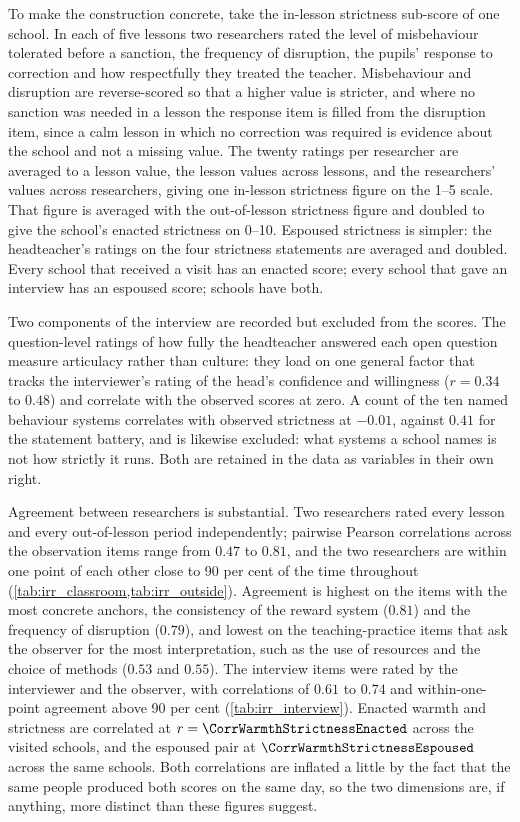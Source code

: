 To make the construction concrete, take the in-lesson strictness sub-score
of one school. In each of five lessons two researchers rated the level of
misbehaviour tolerated before a sanction, the frequency of disruption, the
pupils' response to correction and how respectfully they treated the teacher.
Misbehaviour and disruption are reverse-scored so that a higher value is
stricter, and where no sanction was needed in a lesson the response item is
filled from the disruption item, since a calm lesson in which no correction
was required is evidence about the school and not a missing value. The
twenty ratings per researcher are averaged to a lesson value, the lesson
values across lessons, and the researchers' values across researchers, giving
one in-lesson strictness figure on the 1--5 scale. That figure is averaged
with the out-of-lesson strictness figure and doubled to give the school's
enacted strictness on 0--10. Espoused strictness is simpler: the
headteacher's ratings on the four strictness statements are averaged and
doubled. Every school that received a visit has an enacted score; every
school that gave an interview has an espoused score; \NTierOne{} schools
have both.

Two components of the interview are recorded but excluded from the scores. The
question-level ratings of how fully the headteacher answered each open
question measure articulacy rather than culture: they load on one general
factor that tracks the interviewer's rating of the head's confidence and
willingness ($r = 0.34$ to $0.48$) and correlate with the observed scores at
zero. A count of the ten named behaviour systems correlates with observed
strictness at $-0.01$, against $0.41$ for the statement battery, and is
likewise excluded: what systems a school names is not how strictly it runs.
Both are retained in the data as variables in their own right.

Agreement between researchers is substantial. Two researchers rated every
lesson and every out-of-lesson period independently; pairwise Pearson
correlations across the observation items range from $0.47$ to $0.81$, and
the two researchers are within one point of each other close to 90 per cent
of the time throughout (\cref{tab:irr_classroom,tab:irr_outside}). Agreement
is highest on the items with the most concrete anchors, the consistency of
the reward system ($0.81$) and the frequency of disruption ($0.79$), and
lowest on the teaching-practice items that ask the observer for the most
interpretation, such as the use of resources and the choice of methods
($0.53$ and $0.55$). The interview items were rated by the interviewer and
the observer, with correlations of $0.61$ to $0.74$ and within-one-point
agreement above 90 per cent (\cref{tab:irr_interview}). Enacted warmth and
strictness are correlated at $r = \CorrWarmthStrictnessEnacted$ across the
\NTierOne{} visited schools, and the espoused pair at
$\CorrWarmthStrictnessEspoused$ across the same schools. Both correlations
are inflated a little by the fact that the same people produced both scores
on the same day, so the two dimensions are, if anything, more distinct than
these figures suggest.

